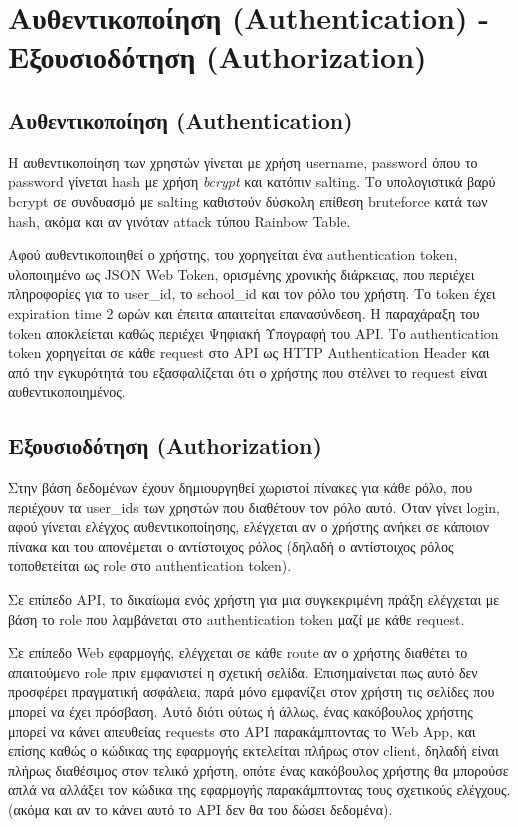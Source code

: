 \documentclass[a4paper]{article}
\begin{document}
\section{Αυθεντικοποίηση (Authentication) - Εξουσιοδότηση (Authorization)}

\subsection{Αυθεντικοποίηση (Authentication)}

\par Η αυθεντικοποίηση των χρηστών γίνεται με χρήση username, password όπου το password γίνεται hash με χρήση \textit{bcrypt} και κατόπιν salting. Το υπολογιστικά βαρύ bcrypt σε συνδυασμό με salting καθιστούν δύσκολη επίθεση bruteforce κατά των hash, ακόμα και αν γινόταν attack τύπου Rainbow Table.

\par Αφού αυθεντικοποιηθεί ο χρήστης, του χορηγείται ένα authentication token, υλοποιημένο ως JSON Web Token, ορισμένης χρονικής διάρκειας, που περιέχει πληροφορίες για το user\_id, το school\_id και τον ρόλο του χρήστη. Το token έχει expiration time 2 ωρών και έπειτα απαιτείται επανασύνδεση. Η παραχάραξη του token αποκλείεται καθώς περιέχει Ψηφιακή Υπογραφή του API. Το authentication token χορηγείται σε κάθε request στο API ως HTTP Authentication Header και από την εγκυρότητά του εξασφαλίζεται ότι ο χρήστης που στέλνει το request είναι αυθεντικοποιημένος.

\subsection{Εξουσιοδότηση (Authorization)}

\par Στην βάση δεδομένων έχουν δημιουργηθεί χωριστοί πίνακες για κάθε ρόλο, που περιέχουν τα user\_ids των χρηστών που διαθέτουν τον ρόλο αυτό. Όταν γίνει login, αφού γίνεται ελέγχος αυθεντικοποίησης, ελέγχεται αν ο χρήστης ανήκει σε κάποιον πίνακα και του απονέμεται ο αντίστοιχος ρόλος (δηλαδή ο αντίστοιχος ρόλος τοποθετείται ως role στο authentication token).

\par Σε επίπεδο API, το δικαίωμα ενός χρήστη για μια συγκεκριμένη πράξη ελέγχεται με βάση το role που λαμβάνεται στο authentication token μαζί με κάθε request.

\par Σε επίπεδο Web εφαρμογής, ελέγχεται σε κάθε route αν ο χρήστης διαθέτει το απαιτούμενο role πριν εμφανιστεί η σχετική σελίδα. Επισημαίνεται πως αυτό δεν προσφέρει πραγματική ασφάλεια, παρά μόνο εμφανίζει στον χρήστη τις σελίδες που μπορεί να έχει πρόσβαση. Αυτό διότι ούτως ή άλλως, ένας κακόβουλος χρήστης μπορεί να κάνει απευθείας requests στο API παρακάμπτοντας το Web App, και επίσης καθώς ο κώδικας της εφαρμογής εκτελείται πλήρως στον client, δηλαδή είναι πλήρως διαθέσιμος στον τελικό χρήστη, οπότε ένας κακόβουλος χρήστης θα μπορούσε απλά να αλλάξει τον κώδικα της εφαρμογής παρακάμπτοντας τους σχετικούς ελέγχους. (ακόμα και αν το κάνει αυτό το API δεν θα του δώσει δεδομένα).
\end{document}
